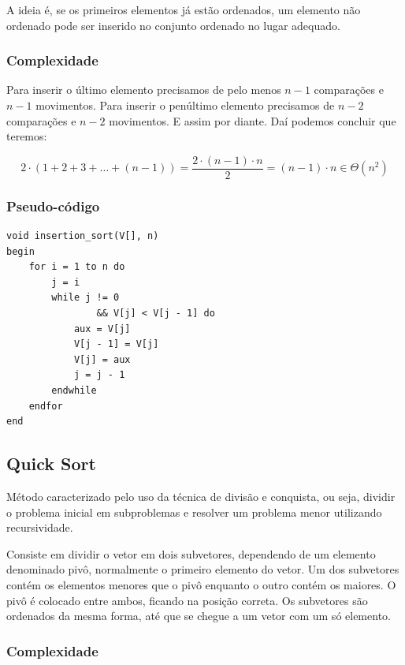 A ideia é, se os primeiros elementos já estão ordenados, um elemento não
ordenado pode ser inserido no conjunto ordenado no lugar adequado.

\subsubsection{Complexidade}

Para inserir o último elemento precisamos de pelo menos $n - 1$
comparações e $n - 1$ movimentos. Para inserir o penúltimo elemento
precisamos de $n - 2$ comparações e $n - 2$ movimentos. E assim por
diante. Daí podemos concluir que teremos:

\begin{equation}
2 \cdot (1 + 2 + 3 + \dots + (n - 1)) = \frac{2 \cdot (n - 1) \cdot n}{2} = (n - 1) \cdot n \in \Theta(n^2)
\end{equation}

\subsubsection{Pseudo-código}

\begin{verbatim}
void insertion_sort(V[], n)
begin
    for i = 1 to n do
        j = i
        while j != 0
                && V[j] < V[j - 1] do
            aux = V[j]
            V[j - 1] = V[j]
            V[j] = aux
            j = j - 1
        endwhile
    endfor
end
\end{verbatim}
\subsection{Quick Sort}

Método caracterizado pelo uso da técnica de divisão e conquista, ou
seja, dividir o problema inicial em subproblemas e resolver um problema
menor utilizando recursividade.

Consiste em dividir o vetor em dois subvetores, dependendo de um
elemento denominado pivô, normalmente o primeiro elemento do vetor. Um
dos subvetores contém os elementos menores que o pivô enquanto o outro
contém os maiores. O pivô é colocado entre ambos, ficando na posição
correta. Os subvetores são ordenados da mesma forma, até que se chegue a
um vetor com um só elemento.

\subsubsection{Complexidade}

